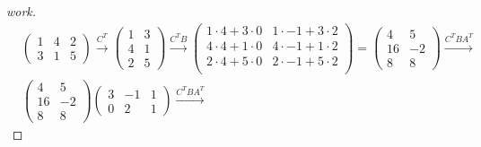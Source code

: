 \begin{question}{1.3}{}
  \begin{proof}[work]
    \begin{align*}
       & \begin{pmatrix}
           1 & 4 & 2 \\
           3 & 1 & 5
         \end{pmatrix} \xrightarrow{C^T}
      \begin{pmatrix}
        1 & 3 \\
        4 & 1 \\
        2 & 5
      \end{pmatrix}  \xrightarrow{C^TB}
      \begin{pmatrix}
        1 \cdot 4 + 3 \cdot 0 & 1 \cdot -1 + 3 \cdot 2 \\
        4 \cdot 4 + 1 \cdot 0 & 4 \cdot -1 + 1 \cdot 2 \\
        2 \cdot 4 + 5 \cdot 0 & 2 \cdot -1 + 5 \cdot 2 \\
      \end{pmatrix} =
      \begin{pmatrix}
        4  & 5  \\
        16 & -2 \\
        8  & 8
      \end{pmatrix} \xrightarrow{C^TBA^T} \\
       & \begin{pmatrix}
           4  & 5  \\
           16 & -2 \\
           8  & 8
         \end{pmatrix}
      \begin{pmatrix}
        3 & -1 & 1 \\
        0 & 2  & 1
      \end{pmatrix}  \xrightarrow{C^TBA^T}

\end{align*}
\end{proof}
\end{question}
